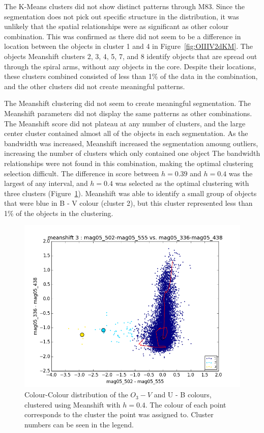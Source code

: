 The K-Means clusters did not show distinct patterns through M83.
Since the segmentation does not pick out specific structure in the distribution, it was unlikely that the spatial relationships were as significant as other colour combination.
This was confirmed as there did not seem to be a difference in location between the objects in cluster 1 and 4 in Figure~\ref{fig:OIIIV2dKM}.
The objects Meanshift clusters 2, 3, 4, 5, 7, and 8 identify objects that are spread out through the spiral arms, without any objects in the core.
Despite their locations, these clusters combined consisted of less than 1\% of the data in the combination, and the other clusters did not create meaningful patterns.

The Meanshift clustering did not seem to create meaningful segmentation.
The Meanshift parameters did not display the same patterns as other combinations. 
The Meanshift score did not plateau at any number of clusters, and the large center cluster contained almost all of the objects in each segmentation.
As the bandwidth was increased, Meanshift increased the segmentation amoung outliers, increasing the number of clusters which only contained one object
The bandwidth relationships were not found in this combination, making the optimal clustering selection difficult. 
The difference in score between $h=0.39$ and $h=0.4$ was the largest of any interval, and $h=0.4$ was selected as the optimal clustering with three clusters (Figure~\ref{fig:OIIIV2dMS}).
Meanshift was able to identify a small group of objects that were blue in B - V colour (cluster 2), but this cluster represented less than 1\% of the objects in the clustering. 

\begin{figure}
\centering
\includegraphics[width=\linewidth]{figs/unsuccessful/meanshift_color_3cl_mag05_502-mag05_555vsmag05_336-mag05_438}
\caption{Colour-Colour distribution of the $O_{3} - V$ and U - B colours, clustered using Meanshift with $h=0.4$. The colour of each point corresponds to the cluster the point was assigned to. Cluster numbers can be seen in the legend.}
\label{fig:OIIIV2dMS}
\end{figure}

